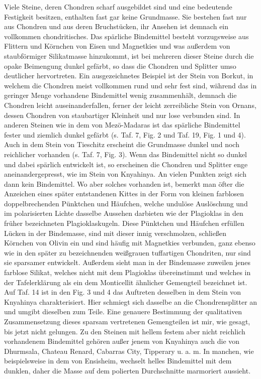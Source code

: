\documentclass[a4paper, 12pt, oneside]{article}
\begin{document}
Viele Steine, deren Chondren scharf ausgebildet sind und eine bedeutende Festigkeit besitzen, enthalten fast gar keine Grundmasse. Sie bestehen fast nur aus Chondren und aus deren Bruchstücken, ihr Ansehen ist demnach ein vollkommen chondritisches. Das spärliche Bindemittel besteht vorzugsweise aus Flittern und Körnchen von Eisen und Magnetkies und was außerdem von staubförmiger Silikatmasse hinzukommt, ist bei mehreren dieser Steine durch die opake Beimengung dunkel gefärbt, so dass die Chondren und Splitter umso deutlicher hervortreten. Ein ausgezeichnetes Beispiel ist der Stein von Borkut, in welchem die Chondren meist vollkommen rund und sehr fest sind, während das in geringer Menge vorhandene Bindemittel wenig zusammenhält, demnach die Chondren leicht auseinanderfallen, ferner der leicht zerreibliche Stein von Ornans, dessen Chondren von staubartiger Kleinheit und nur lose verbunden sind. In anderen Steinen wie in dem von Mezö-Madaras ist das spärliche Bindemittel fester und ziemlich dunkel gefärbt (s. Taf. 7, Fig. 2 und Taf. 19, Fig. 1 und 4). Auch in dem Stein von Tieschitz erscheint die Grundmasse dunkel und noch reichlicher vorhanden (s. Taf. 7, Fig. 3). Wenn das Bindemittel nicht so dunkel und dabei spärlich entwickelt ist, so erscheinen die Chondren und Splitter enge aneinandergepresst, wie im Stein von Knyahinya. An vielen Punkten zeigt sich dann kein Bindemittel. Wo aber solches vorhanden ist, bemerkt man öfter die Anzeichen eines später entstandenen Kittes in der Form von kleinen farblosen doppelbrechenden Pünktchen und Häufchen, welche undulöse Auslöschung und im polarisierten Lichte dasselbe Aussehen darbieten wie der Plagioklas in den früher bezeichneten Plagioklaskugeln. Diese Pünktchen und Häufchen erfüllen Lücken in der Bindemasse, sind mit dieser innig verschmolzen, schließen Körnchen von Olivin ein und sind häufig mit Magnetkies verbunden, ganz ebenso wie in den später zu bezeichnenden weißgrauen tuffartigen Chondriten, nur sind sie sparsamer entwickelt. Außerdem sieht man in der Bindemasse zuweilen jenes farblose Silikat, welches nicht mit dem Plagioklas übereinstimmt und welches in der Tafelerklärung als ein dem Monticellit ähnlicher Gemengteil bezeichnet ist. Auf Taf. 14 ist in den Fig. 3 und 4 das Auftreten desselben in dem Stein von Knyahinya charakterisiert. Hier schmiegt sich dasselbe an die Chondrensplitter an und umgibt dieselben zum Teile. Eine genauere Bestimmung der qualitativen Zusammensetzung dieses sparsam vertretenen Gemengteilen ist mir, wie gesagt, bis jetzt nicht gelungen. Zu den Steinen mit hellem festem aber nicht reichlich vorhandenem Bindemittel gehören außer jenem von Knyahinya auch die von Dhurmsala, Chateau Renard, Cabarras City, Tipperary u. a. m. In manchen, wie beispielsweise in dem von Ensisheim, wechselt helles Bindemittel mit dem dunklen, daher die Masse auf dem polierten Durchschnitte marmoriert aussieht.
\end{document}
